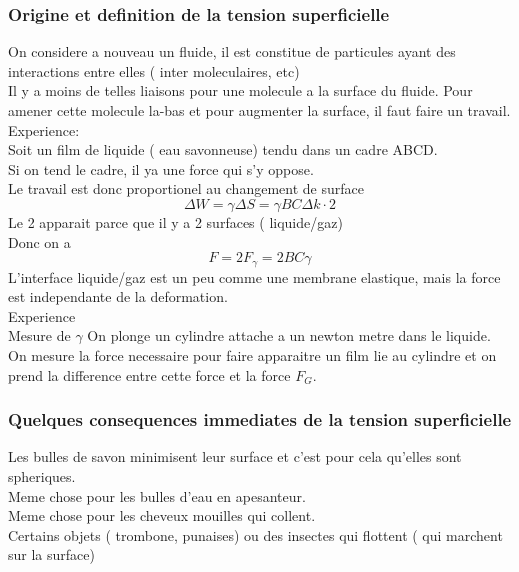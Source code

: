\documentclass[../main.tex]{subfiles}
\begin{document}
\subsubsection{Origine et definition de la tension superficielle}
On considere a nouveau un fluide, il est constitue de particules ayant des interactions entre elles ( inter moleculaires, etc) \\
Il y a moins de telles liaisons pour une molecule a la surface du fluide. Pour amener cette molecule la-bas et pour augmenter la surface, il faut faire un travail.\\
Experience:\\
Soit un film de liquide ( eau savonneuse) tendu dans un cadre ABCD.\\
Si on tend le cadre, il ya une force qui s'y oppose.\\
Le travail est donc proportionel au changement de surface
\[ 
\Delta W = \gamma \Delta S = \gamma BC \Delta k \cdot 2
\]
Le 2 apparait parce que il y a 2 surfaces ( liquide/gaz)\\
Donc on a
\[ 
F= 2 F_\gamma = 2 BC \gamma
\]
L'interface liquide/gaz est un peu comme une membrane elastique, mais la force est independante de la deformation.\\
Experience\\
Mesure de $\gamma$ 
On plonge un cylindre attache a un newton metre dans le liquide.\\
On mesure la force necessaire pour faire apparaitre un film lie au cylindre et on prend la difference entre cette force et la force $F_G$.\\

\subsubsection{Quelques consequences immediates de la tension superficielle}
Les bulles de savon minimisent leur surface et c'est pour cela qu'elles sont spheriques.\\
Meme chose pour les bulles d'eau en apesanteur.\\
Meme chose pour les cheveux mouilles qui collent.\\
Certains objets ( trombone, punaises) ou des insectes qui flottent ( qui marchent sur la surface) 
\end{document}
